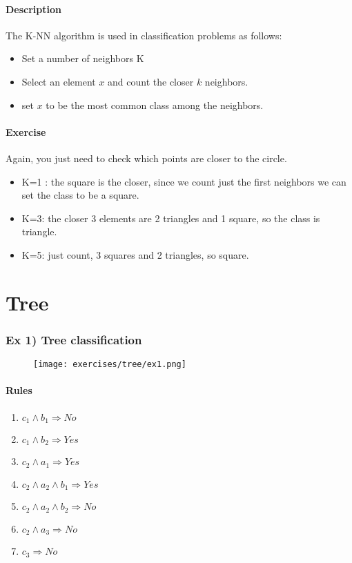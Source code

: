 \paragraph{Description}
The K-NN algorithm is used in classification problems as follows:
\begin{itemize}
\item Set a number of neighbors K
\item Select an element $x$ and count the closer $k$ neighbors.
\item set $x$ to be the most common class among the neighbors.
\end{itemize}

\paragraph{Exercise}
Again, you just need to check which points are closer to the circle. 
\begin{itemize}
\item K=1 : the square is the closer, since we count just the first neighbors we can set the class to be a square.
\item K=3: the closer 3 elements are 2 triangles and 1 square, so the class is triangle.
\item K=5: just count, 3 squares and 2 triangles, so square.
\end{itemize}





\section{Tree}

\subsubsection{Ex 1) Tree classification}
\begin{figure}[H]
    \centering
    \texttt{[image: exercises/tree/ex1.png]}
\end{figure}

\paragraph{Rules}
\begin{enumerate}

\item $c_1 \wedge b_1 \Rightarrow No $
\item $c_1 \wedge b_2 \Rightarrow Yes $
\item $c_2 \wedge a_1 \Rightarrow Yes $
\item $c_2 \wedge a_2 \wedge b_1 \Rightarrow Yes $
\item $c_2 \wedge a_2 \wedge b_2 \Rightarrow No $
\item $c_2 \wedge a_3 \Rightarrow No $
\item $c_3  \Rightarrow No $
\end{enumerate}

